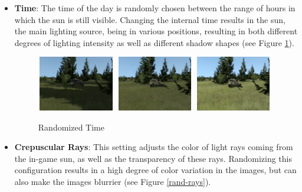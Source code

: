 \begin{itemize}
    \begin{itemize}
        \item \textbf{Time}: The time of the day is randomly chosen between the range of hours in which the sun is still visible. Changing the internal time results in the sun, the main lighting source, being in various positions, resulting in both different degrees of lighting intensity as well as different shadow shapes (see Figure \ref{rand-time}). 
        \begin{figure}[H]
        \centering
        \subcaptionbox{}
          {\includegraphics[height=2.4cm, width=3.4cm]{images/vbs3/random-light/time/time-0.png}}
        \subcaptionbox{}%
          {\includegraphics[height=2.4cm, width=3.4cm]{images/vbs3/random-light/time/time-3.png}}
        \subcaptionbox{}%
          {\includegraphics[height=2.4cm, width=3.4cm]{images/vbs3/random-light/time/time-5.png}}
        \caption{Randomized Time}
                \label{rand-time}
        \end{figure}
    
        \item \textbf{Crepuscular Rays}: This setting adjusts the color of light rays coming from the in-game sun, as well as the transparency of these rays. Randomizing this configuration results in a high degree of color variation in the images, but can also make the images blurrier (see Figure \ref{rand-rays}). 
     

\end{itemize}
\end{itemize}
